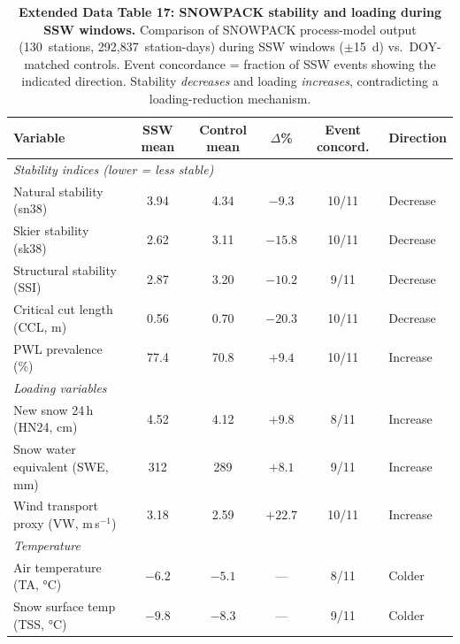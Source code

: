 \documentclass[11pt,letterpaper]{article}
\begin{document}
\begin{table}[!ht]
\centering
\caption{\textbf{Extended Data Table 17: SNOWPACK stability and loading during SSW windows.}
Comparison of SNOWPACK process-model output (130~stations, 292,837~station-days) during SSW windows ($\pm$15~d) vs.\ DOY-matched controls. Event concordance = fraction of SSW events showing the indicated direction. Stability \emph{decreases} and loading \emph{increases}, contradicting a loading-reduction mechanism.}
\label{tab:snowpack}
\small
\begin{tabular}{lccccl}
\toprule
Variable & SSW mean & Control mean & $\Delta$\% & Event concord. & Direction \\
\midrule
\multicolumn{6}{l}{\textit{Stability indices (lower = less stable)}} \\
Natural stability (sn38) & 3.94 & 4.34 & $-9.3$ & 10/11 & Decrease \\
Skier stability (sk38) & 2.62 & 3.11 & $-15.8$ & 10/11 & Decrease \\
Structural stability (SSI) & 2.87 & 3.20 & $-10.2$ & 9/11 & Decrease \\
Critical cut length (CCL, m) & 0.56 & 0.70 & $-20.3$ & 10/11 & Decrease \\
PWL prevalence (\%) & 77.4 & 70.8 & $+9.4$ & 10/11 & Increase \\
\midrule
\multicolumn{6}{l}{\textit{Loading variables}} \\
New snow 24\,h (HN24, cm) & 4.52 & 4.12 & $+9.8$ & 8/11 & Increase \\
Snow water equivalent (SWE, mm) & 312 & 289 & $+8.1$ & 9/11 & Increase \\
Wind transport proxy (VW, m\,s$^{-1}$) & 3.18 & 2.59 & $+22.7$ & 10/11 & Increase \\
\midrule
\multicolumn{6}{l}{\textit{Temperature}} \\
Air temperature (TA, °C) & $-6.2$ & $-5.1$ & --- & 8/11 & Colder \\
Snow surface temp (TSS, °C) & $-9.8$ & $-8.3$ & --- & 9/11 & Colder \\
\bottomrule
\end{tabular}
\end{table}
\end{document}
